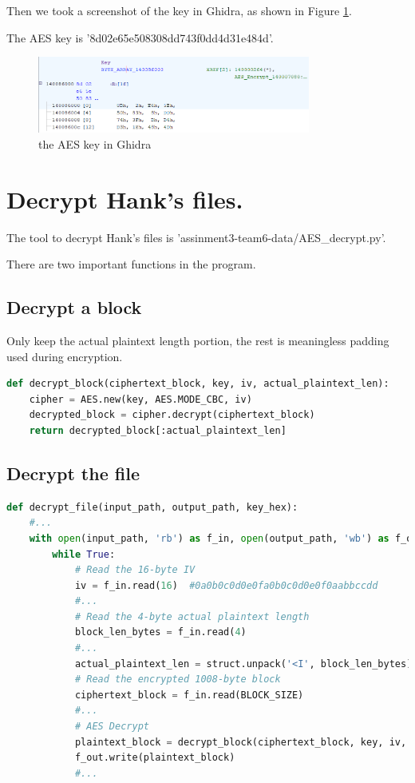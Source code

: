 \documentclass[11pt]{article}
\begin{document}
Then we took a screenshot of the key in Ghidra, as shown in Figure \ref{fig:key}.

The AES key is '8d02e65e508308dd743f0dd4d31e484d'.
\begin{figure}[htbp]
    \centering
    \includegraphics[width=0.8\textwidth]{img/key.png}
    \caption{the AES key in Ghidra}
    \label{fig:key}
\end{figure}

\section{Decrypt Hank's files.}
The tool to decrypt Hank's files is 'assinment3-team6-data/AES\_decrypt.py'.

There are two important functions in the program.

\subsection{Decrypt a block}
Only keep the actual plaintext length portion, the rest is meaningless padding used during encryption.

\begin{lstlisting}[language=python, caption=decrypt\_block]
def decrypt_block(ciphertext_block, key, iv, actual_plaintext_len):
    cipher = AES.new(key, AES.MODE_CBC, iv)
    decrypted_block = cipher.decrypt(ciphertext_block)
    return decrypted_block[:actual_plaintext_len]
\end{lstlisting}

\subsection{Decrypt the file}

\begin{lstlisting}[language=python, caption=decrypt\_file]
def decrypt_file(input_path, output_path, key_hex):
    #...
    with open(input_path, 'rb') as f_in, open(output_path, 'wb') as f_out:
        while True:
            # Read the 16-byte IV
            iv = f_in.read(16)  #0a0b0c0d0e0fa0b0c0d0e0f0aabbccdd
            #...
            # Read the 4-byte actual plaintext length
            block_len_bytes = f_in.read(4)
            #...
            actual_plaintext_len = struct.unpack('<I', block_len_bytes)[0]
            # Read the encrypted 1008-byte block
            ciphertext_block = f_in.read(BLOCK_SIZE)
            #...
            # AES Decrypt
            plaintext_block = decrypt_block(ciphertext_block, key, iv, actual_plaintext_len)
            f_out.write(plaintext_block)
            #...
\end{lstlisting}
\end{document}
